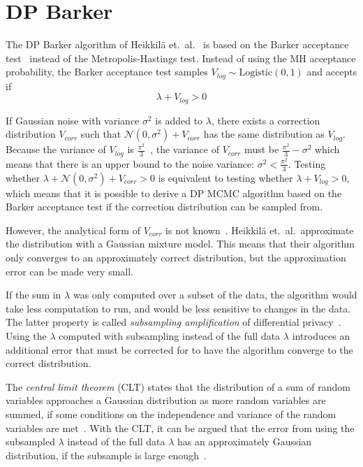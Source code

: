 \documentclass[english,twoside,openright]{HYgraduMLDS}
\newcommand{\caln}{{\mathcal{N}}}
\begin{document}
\section{DP Barker}

The DP Barker algorithm of Heikkilä et.\ al.~\cite{HeikkilaJDH19} is based on 
the Barker acceptance test~\cite{Barker65} instead of the Metropolis-Hastings test.
Instead of using the MH acceptance probability, the Barker acceptance test samples 
\(V_{log}\sim \mathrm{Logistic(0, 1)}\) and accepts if 
\[
    \lambda + V_{log} > 0
\]

If Gaussian noise with variance \(\sigma^2\) is added to 
\(\lambda\), there exists a correction 
distribution \(V_{corr}\) such that \(\caln(0, \sigma^2) + V_{corr}\) has the 
same distribution as \(V_{log}\). Because the variance of \(V_{log}\) is 
\(\frac{\pi^2}{3}\)~\cite{HeikkilaJDH19}, the variance of \(V_{corr}\) must be 
\(\frac{\pi^2}{3} - \sigma^2\) which means that there is an upper bound
to the noise variance: \(\sigma^2 < \frac{\pi^2}{3}\). Testing whether 
\(\lambda + \caln(0, \sigma^2) + V_{corr} > 0\) is equivalent to testing 
whether \(\lambda + V_{log} > 0\), which means that it is possible to derive 
a DP MCMC algorithm based on the Barker acceptance test if the correction 
distribution can be sampled from.

However, the analytical form of \(V_{corr}\) is not known~\cite{HeikkilaJDH19}.
Heikkilä et.\ al.\  approximate the distribution with a Gaussian mixture model. 
This means that their 
algorithm only converges to an approximately correct distribution, but the 
approximation error can be made very small.

If the sum in \(\lambda\) was only computed over a subset of the data, the 
algorithm would take less computation to run, and would be less sensitive 
to changes in the data. The latter property is called \emph{subsampling amplification}
of differential privacy~\cite{WangBK19}. Using the \(\lambda\) computed 
with subsampling instead of the full data \(\lambda\) introduces an additional 
error that must be corrected for to have the algorithm converge to the correct 
distribution. 

The \emph{central limit theorem} (CLT) states that the distribution of a sum 
of random variables approaches a Gaussian distribution as more random variables 
are summed, if some conditions on the independence and variance of the random 
variables are met~\cite{HeikkilaJDH19}. With the CLT, it can be argued 
that the error from 
using the subsampled \(\lambda\) instead of the full data \(\lambda\) has an 
approximately Gaussian distribution, if the subsample is large 
enough~\cite{HeikkilaJDH19}. 
\end{document}
